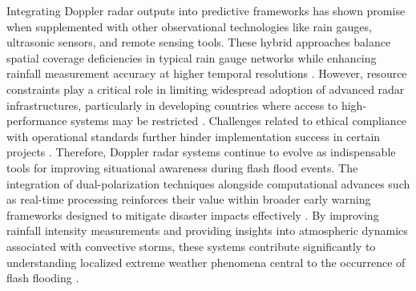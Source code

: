 Integrating Doppler radar outputs into predictive frameworks has shown promise when supplemented with other observational technologies like rain gauges, ultrasonic sensors, and remote sensing tools. These hybrid approaches balance spatial coverage deficiencies in typical rain gauge networks while enhancing rainfall measurement accuracy at higher temporal resolutions \citep{Abegaz2024}\citep{Msigwa2024}. However, resource constraints play a critical role in limiting widespread adoption of advanced radar infrastructures, particularly in developing countries where access to high-performance systems may be restricted \citep{Jubach2016}\citep{Yang2022}. Challenges related to ethical compliance with operational standards further hinder implementation success in certain projects \citep{Msigwa2024}.
Therefore, Doppler radar systems continue to evolve as indispensable tools for improving situational awareness during flash flood events. The integration of dual-polarization techniques alongside computational advances such as real-time processing reinforces their value within broader early warning frameworks designed to mitigate disaster impacts effectively \citep{Zanchetta2020}. By improving rainfall intensity measurements and providing insights into atmospheric dynamics associated with convective storms, these systems contribute significantly to understanding localized extreme weather phenomena central to the occurrence of flash flooding \citep{Hermoso2021}\citep{Ngo2018}\citep{Yatheendradas2008}.

